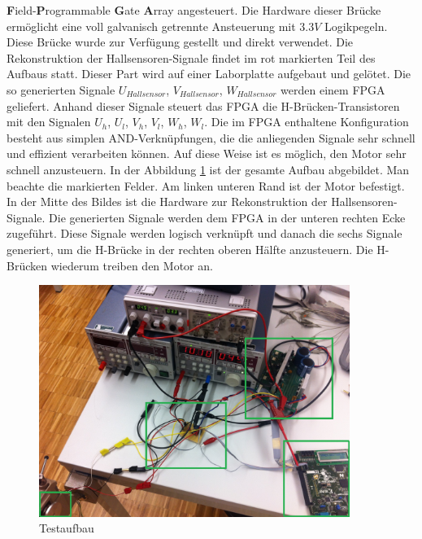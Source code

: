     {\textbf{F}ield-\textbf{P}rogrammable \textbf{G}ate 
    \textbf{A}rray} angesteuert. Die Hardware dieser Brücke ermöglicht eine 
    voll galvanisch getrennte Ansteuerung mit $3.3 V$ Logikpegeln. Diese 
    Brücke wurde zur Verfügung gestellt und direkt verwendet. Die 
    Rekonstruktion der Hallsensoren-Signale findet im rot markierten Teil des 
    Aufbaus statt. Dieser Part wird auf einer Laborplatte aufgebaut und 
    gelötet. Die so generierten Signale $U_{Hallsensor}$, $V_{Hallsensor}$, 
    $W_{Hallsensor}$ werden einem FPGA geliefert. Anhand dieser Signale 
    steuert das FPGA die H-Brücken-Transistoren mit den Signalen $U_h$, $U_l$, 
    $V_h$, $V_l$, $W_h$, $W_l$. Die im FPGA enthaltene Konfiguration besteht 
    aus simplen AND-Verknüpfungen, die die anliegenden Signale sehr schnell 
    und effizient verarbeiten können. Auf diese Weise ist es möglich, den 
    Motor sehr schnell anzusteuern.
    In der Abbildung \ref{abb:MessplatzAufbau} ist der gesamte Aufbau 
    abgebildet. Man beachte die markierten Felder. Am linken unteren Rand ist 
    der Motor befestigt. In der Mitte des Bildes ist die Hardware zur 
    Rekonstruktion der Hallsensoren-Signale.  Die generierten Signale werden 
    dem FPGA in der unteren rechten Ecke zugeführt. Diese Signale werden 
    logisch verknüpft und danach die sechs Signale generiert, um die H-Brücke 
    in der rechten oberen Hälfte anzusteuern.  Die H-Brücken wiederum treiben 
    den Motor an.
    \begin{figure}[h!]
       	\includegraphics[width=0.9\textwidth]{fig/MessplatzAufbau.jpg}
       	\centering
       	\caption[Testaufbau BLDC Treiber]{Testaufbau} 
        \label{abb:MessplatzAufbau}
    \end{figure}
